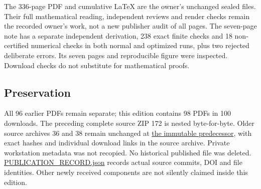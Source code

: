 \documentclass[
]{article}
\begin{document}
The 336-page PDF and cumulative LaTeX are the owner's unchanged sealed
files. Their full mathematical reading, independent reviews and render
checks remain the recorded owner's work, not a new publisher audit of
all pages. The seven-page note has a separate independent derivation,
238 exact finite checks and 18 non-certified numerical checks in both
normal and optimized runs, plus two rejected deliberate errors. Its
seven pages and reproducible figure were inspected. Download checks do
not substitute for mathematical proofs.

\subsection{Preservation}\label{preservation}

All 96 earlier PDFs remain separate; this edition contains 98 PDFs in
100 downloads. The preceding complete source ZIP 172 is nested
byte-for-byte. Older source archives 36 and 38 remain unchanged at
\href{https://zenodo.org/records/22911205}{the immutable predecessor},
with exact hashes and individual download links in the source archive.
Private workstation metadata was not recopied. No historical published
file was deleted. \url{PUBLICATION_RECORD.json} records actual source
commits, DOI and file identities. Other newly received components are
not silently claimed inside this edition.
\end{document}
